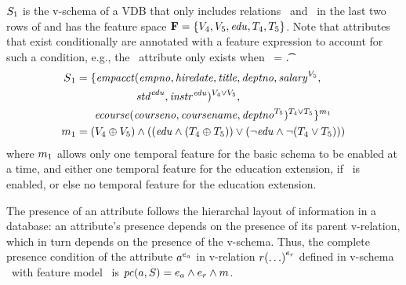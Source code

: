 \begin{example}
\label{eg:vsch}
$\vSch_1$ is the v-schema of a VDB that only includes relations \empacct\ and \ecourse\ in the last two rows
of  and has the
feature space 
\ensuremath{\fSet = \setDef{ \vFour, \vFive, \edu, \tFour, \tFive}}.
Note that attributes that exist conditionally are annotated with a feature expression
to account for such a condition, e.g., the \salary\ attribute only exists when \vFive\ = \t.
%
\begin{align*}
\vSch_1 &=
\{ \empacct ( \empno, \hiredate, \titleatt, \deptno, \annot [\vFive] \salary, \\
&\hspace{55pt} \annot [\edu] \isstudent,
\annot [\edu] \isteacher )^{\vFour \vee \vFive},\\
%
&\hspace{17pt} \ecourse ( \cno, \cname, \annot [\tFive] \deptno )^{\tFour \vee \tFive} \}^{\fModel_1}\\
\fModel_1 &= (\vFour\oplus\vFive) \wedge
  ((\edu\wedge(\tFour\oplus\tFive)) \vee (\neg\edu\wedge\neg(\tFour\vee\tFive)))
\end{align*}
where \ensuremath{\fModel_1} allows only one temporal feature for the basic
schema to be enabled at a time, and either one temporal feature for the education
extension, if \edu\ is enabled, or else no temporal feature for the education
extension.
\end{example}


%

The presence of an attribute follows the hierarchal layout of information in a database:
an attribute's presence depends on the presence of its parent v-relation, which in turn 
depends on the presence of the v-schema. 
%
Thus, the complete presence condition of the attribute
$\annot[\dimMeta_\vAtt]{\vAtt}$ in v-relation
$\vRel\annot[\dimMeta_\vRel]{(\ldots)}$ defined in v-schema \vSch\ with feature
model \fModel\ is
$\getPCfrom{\vAtt}{\vSch}=\dimMeta_\vAtt\wedge\dimMeta_\vRel\wedge\fModel$.

